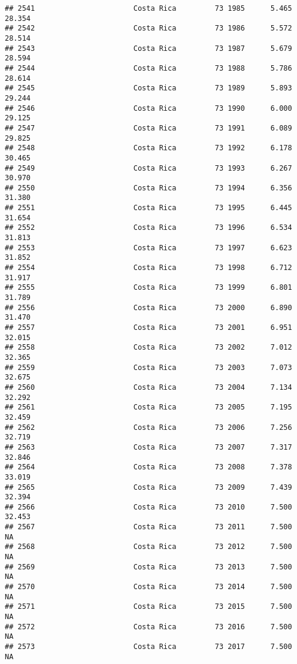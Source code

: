 \documentclass[
]{article}
\begin{document}
\begin{verbatim}
## 2541                       Costa Rica         73 1985      5.465     28.354
## 2542                       Costa Rica         73 1986      5.572     28.514
## 2543                       Costa Rica         73 1987      5.679     28.594
## 2544                       Costa Rica         73 1988      5.786     28.614
## 2545                       Costa Rica         73 1989      5.893     29.244
## 2546                       Costa Rica         73 1990      6.000     29.125
## 2547                       Costa Rica         73 1991      6.089     29.825
## 2548                       Costa Rica         73 1992      6.178     30.465
## 2549                       Costa Rica         73 1993      6.267     30.970
## 2550                       Costa Rica         73 1994      6.356     31.380
## 2551                       Costa Rica         73 1995      6.445     31.654
## 2552                       Costa Rica         73 1996      6.534     31.813
## 2553                       Costa Rica         73 1997      6.623     31.852
## 2554                       Costa Rica         73 1998      6.712     31.917
## 2555                       Costa Rica         73 1999      6.801     31.789
## 2556                       Costa Rica         73 2000      6.890     31.470
## 2557                       Costa Rica         73 2001      6.951     32.015
## 2558                       Costa Rica         73 2002      7.012     32.365
## 2559                       Costa Rica         73 2003      7.073     32.675
## 2560                       Costa Rica         73 2004      7.134     32.292
## 2561                       Costa Rica         73 2005      7.195     32.459
## 2562                       Costa Rica         73 2006      7.256     32.719
## 2563                       Costa Rica         73 2007      7.317     32.846
## 2564                       Costa Rica         73 2008      7.378     33.019
## 2565                       Costa Rica         73 2009      7.439     32.394
## 2566                       Costa Rica         73 2010      7.500     32.453
## 2567                       Costa Rica         73 2011      7.500         NA
## 2568                       Costa Rica         73 2012      7.500         NA
## 2569                       Costa Rica         73 2013      7.500         NA
## 2570                       Costa Rica         73 2014      7.500         NA
## 2571                       Costa Rica         73 2015      7.500         NA
## 2572                       Costa Rica         73 2016      7.500         NA
## 2573                       Costa Rica         73 2017      7.500         NA

\end{verbatim}
\end{document}
